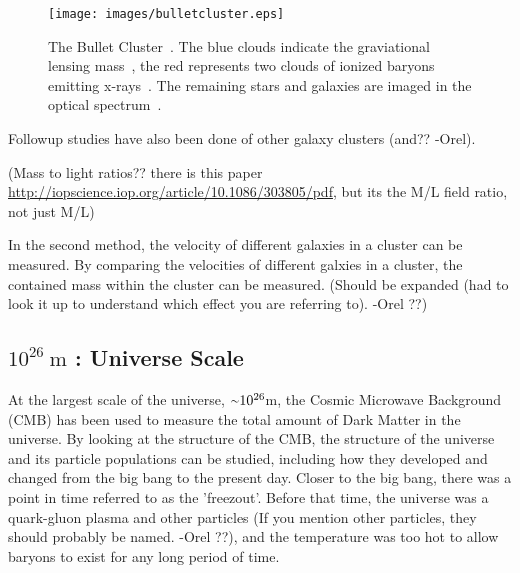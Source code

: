     \begin{figure}[ht]
      \centering
      \texttt{[image: images/bulletcluster.eps]}
      \caption[The Bullet Cluster]{
        The Bullet Cluster~\cite{bullet_cluster_combined_image}.
        The blue clouds indicate the graviational lensing mass~\cite{bullet_cluster}, the red represents two clouds of ionized baryons emitting x-rays~\cite{bullet_cluster_chandramap}.
        The remaining stars and galaxies are imaged in the optical spectrum~\cite{bullet_cluster_composite}.}
      \label{fig:bullet}
    \end{figure}

    Followup studies have also been done of other galaxy clusters {\color{red}(and?? -Orel)}.

    {\color{red}(Mass to light ratios?? there is this paper \url{http://iopscience.iop.org/article/10.1086/303805/pdf}, but its the M/L field ratio, not just M/L)}

    In the second method, the velocity of different galaxies in a cluster can be measured.
    By comparing the velocities of different galxies in a cluster, the contained mass within the cluster can be measured.
    {\color{red}(Should be expanded (had to look it up to understand which effect you are referring to). -Orel ??)}

  \subsection{$10^{26}\:\text{m}$ : Universe Scale}
    At the largest scale of the universe, $\nicetilde 10^{26}$m, the Cosmic Microwave Background (CMB) has been used to measure the total amount of Dark Matter in the universe.
    By looking at the structure of the CMB, the structure of the universe and its particle populations can be studied, including how they developed and changed from the big bang to the present day.
    Closer to the big bang, there was a point in time referred to as the 'freezout'.
    Before that time, the universe was a quark-gluon plasma {\color{red}and other particles (If you mention other particles, they should probably be named. -Orel ??)}, and the temperature was too hot to allow baryons to exist for any long period of time.

